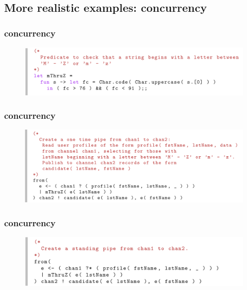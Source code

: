 \documentclass{beamer}
\begin{document}
  \subsection{More realistic examples: concurrency}
  \begin{frame}
    \frametitle{concurrency}    
    \begin{figure}[ht]
      \begin{center}        
        \includegraphics[width=\textwidth,height=0.7\textheight,keepaspectratio]{pipelinefigures/CodeSamplesConcurrencyHelpPredicate.pdf}
      \end{center}      
    \end{figure}    
  \end{frame}
  \begin{frame}
    \frametitle{concurrency}    
    \begin{figure}[ht]
      \begin{center}        
        \includegraphics[width=\textwidth,height=0.7\textheight,keepaspectratio]{pipelinefigures/CodeSamplesOneTimePipe.pdf}
      \end{center}      
    \end{figure}
  \end{frame}
  \begin{frame}
    \frametitle{concurrency}    
    \begin{figure}[ht]
      \begin{center}        
        \includegraphics[width=\textwidth,height=0.7\textheight,keepaspectratio]{pipelinefigures/CodeSamplesStandingPipe.pdf}
      \end{center}      
    \end{figure}
  \end{frame}
\end{document}
